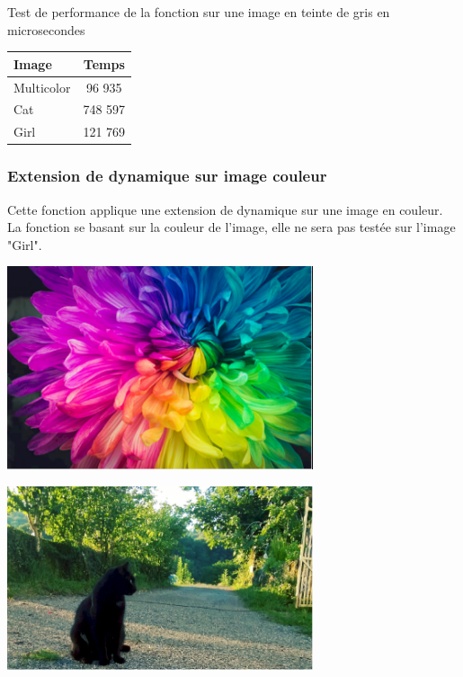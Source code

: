 \documentclass{article}
\begin{document}
\begin{center}
\medbreak
Test de performance de la fonction sur une image en teinte de gris en microsecondes
\bigbreak
   \begin{tabular}{ | l | c | }
     \hline
     Image & Temps \\
     \hline
     Multicolor & 96 935 \\
     \hline
     Cat & 748 597 \\
     \hline
     Girl & 121 769 \\
     \hline
   \end{tabular}
 \end{center}
 \bigbreak

\subsubsection{Extension de dynamique sur image couleur}

Cette fonction applique une extension de dynamique sur une image en couleur. La fonction se basant sur la couleur de l'image, elle ne sera pas testée sur l'image "Girl".

\begin{center} 
    \includegraphics[width=9cm]{../Image_fonctions/Multicolor/LinearColor.PNG}
\end{center}
\begin{center} 
    \includegraphics[width=9cm]{../Image_fonctions/Cat/LinearColor.PNG}
\end{center}
\end{document}
